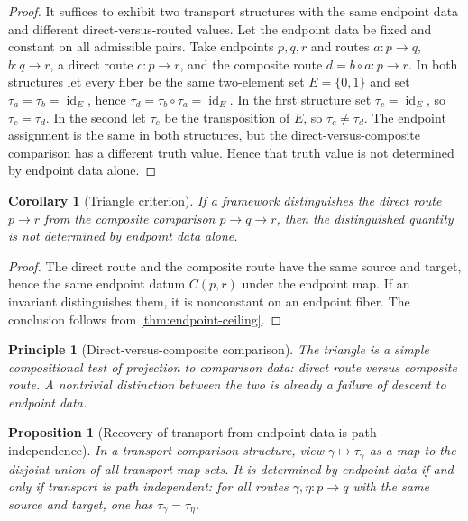 \documentclass[12pt]{article}
\newtheorem{proposition}[proposition]{Proposition}
\newtheorem{corollary}[corollary]{Corollary}
\newtheorem{principle}[principle]{Principle}
\newcommand{\id}{\operatorname{id}}
\begin{document}
\begin{proof}
It suffices to exhibit two transport structures with the same endpoint
data and different direct-versus-routed values. Let the endpoint data be
fixed and constant on all admissible pairs. Take endpoints $p,q,r$ and
routes $a:p\to q$, $b:q\to r$, a direct route $c:p\to r$, and the
composite route $d=b\circ a:p\to r$. In both structures let every fiber
be the same two-element set $E=\{0,1\}$ and set
$\tau_a=\tau_b=\id_E$, hence $\tau_d=\tau_b\circ\tau_a=\id_E$. In
the first structure set $\tau_c=\id_E$, so $\tau_c=\tau_d$. In the
second let $\tau_c$ be the transposition of $E$, so $\tau_c\neq\tau_d$.
The endpoint assignment is the same in both structures, but the
direct-versus-composite comparison has a different truth value. Hence
that truth value is not determined by endpoint data alone.
\end{proof}

\begin{corollary}[Triangle criterion]
\label{cor:triangle-obstruction}
If a framework distinguishes the direct route $p\to r$ from the
composite comparison $p\to q\to r$, then the distinguished quantity is not
determined by endpoint data alone.
\end{corollary}

\begin{proof}
The direct route and the composite route have the same source and
target, hence the same endpoint datum $C(p,r)$ under the endpoint map.
If an invariant distinguishes them, it is nonconstant on an endpoint
fiber. The conclusion follows from \cref{thm:endpoint-ceiling}.
\end{proof}

\begin{principle}[Direct-versus-composite comparison]
\label{prin:triangular-first-test}
The triangle is a simple compositional test of projection to comparison
data: direct route versus composite route. A nontrivial distinction
between the two is already a failure of descent to endpoint data.
\end{principle}

\begin{proposition}[Recovery of transport from endpoint data is path independence]
\label{prop:transport-route-invariant}
In a transport comparison structure, view
$\gamma\mapsto\tau_\gamma$ as a map to the disjoint union of all
transport-map sets. It is determined by endpoint data if and only if
transport is path independent: for all routes $\gamma,\eta:p\to q$ with
the same source and target, one has $\tau_\gamma=\tau_\eta$.
\end{proposition}
\end{document}
